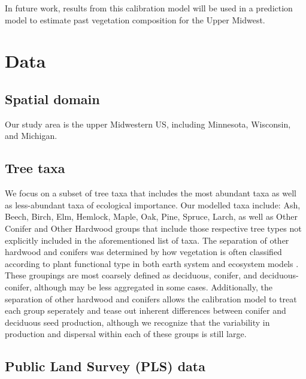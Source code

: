 \documentclass[12pt]{article}
\begin{document}
In future work, results from this calibration model will be used in a
prediction model to estimate past vegetation composition for the Upper
Midwest.

\section{Data}

\subsection{Spatial domain}
Our study area is the upper Midwestern US, including Minnesota,
Wisconsin, and Michigan. 

\subsection{Tree taxa}
We focus on a subset of tree taxa that includes the most abundant taxa
as well as less-abundant taxa of ecological importance. Our modelled
taxa include: Ash, Beech, Birch, Elm, Hemlock, Maple, Oak, Pine,
Spruce, Larch, as well as Other Conifer and Other Hardwood groups that
include those respective tree types not explicitly included in the
aforementioned list of taxa. The separation of other hardwood and
conifers was determined by how vegetation is often classified
according to plant functional type in both earth system and ecosystem
models \cite{cramer2001global, goring}. These groupings are most coarsely defined as
deciduous, conifer, and deciduous-conifer, although may be less
aggregated in some cases. Additionally, the separation of other
hardwood and conifers allows the calibration model to treat each group
seperately and tease out inherent differences between conifer and
deciduous seed production, although we recognize that the variability
in production and dispersal within each of these groups is still
large.


\subsection{Public Land Survey (PLS) data}
\end{document}
